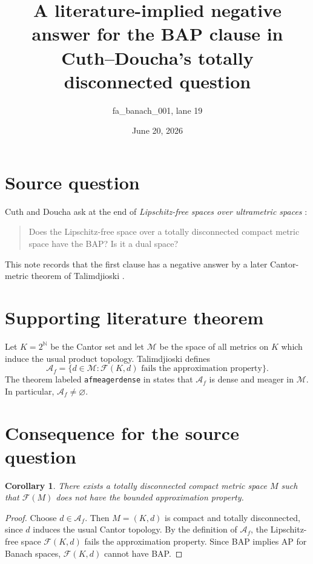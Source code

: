 \documentclass[11pt]{article}
\title{A literature-implied negative answer for the BAP clause in Cuth--Doucha's totally disconnected question}
\author{fa\_banach\_001, lane 19}
\date{June 20, 2026}
\newcommand{\F}{\mathcal F}
\newcommand{\N}{\mathbb N}
\newtheorem*{corollary}{Corollary}
\begin{document}
\maketitle

\section*{Source question}

Cuth and Doucha ask at the end of \emph{Lipschitz-free spaces over
ultrametric spaces} \cite{cuth-doucha}:
\begin{quote}
Does the Lipschitz-free space over a totally disconnected compact metric space
have the BAP? Is it a dual space?
\end{quote}
This note records that the first clause has a negative answer by a later
Cantor-metric theorem of Talimdjioski \cite{talimdjioski}.

\section*{Supporting literature theorem}

Let \(K=2^\N\) be the Cantor set and let \(\mathcal M\) be the space of all
metrics on \(K\) which induce the usual product topology. Talimdjioski defines
\[
\mathcal A_f=\{d\in\mathcal M:\F(K,d)\text{ fails the approximation property}\}.
\]
The theorem labeled \texttt{afmeagerdense} in \cite{talimdjioski} states that
\(\mathcal A_f\) is dense and meager in \(\mathcal M\). In particular,
\(\mathcal A_f\neq\varnothing\).

\section*{Consequence for the source question}

\begin{corollary}
There exists a totally disconnected compact metric space \(M\) such that
\(\F(M)\) does not have the bounded approximation property.
\end{corollary}

\begin{proof}
Choose \(d\in\mathcal A_f\). Then \(M=(K,d)\) is compact and totally
disconnected, since \(d\) induces the usual Cantor topology. By the definition
of \(\mathcal A_f\), the Lipschitz-free space \(\F(K,d)\) fails the
approximation property. Since BAP implies AP for Banach spaces, \(\F(K,d)\)
cannot have BAP.
\end{proof}
\end{document}
